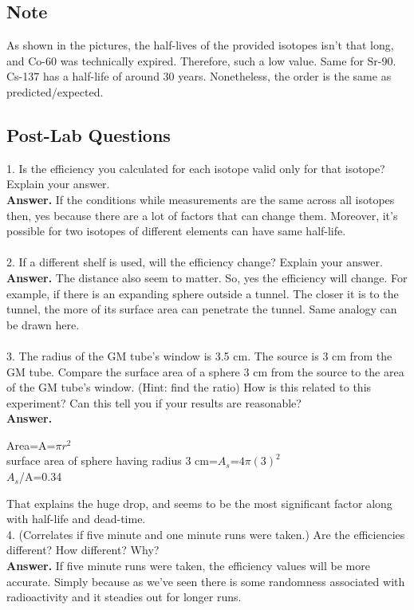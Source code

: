 \documentclass[twocolumn]{article}
\begin{document}
\subsection*{Note}
As shown in the pictures, the half-lives of the provided isotopes isn't that long, and Co-60 was technically expired. Therefore, such a low value. Same for Sr-90. Cs-137 has a half-life of around 30 years. Nonetheless, the order is the same as predicted/expected. 
\subsection*{Post-Lab Questions}

1. Is the efficiency you calculated for each isotope valid only for that isotope? Explain your answer.\\
\textbf{Answer.} If the conditions while measurements are the same across all isotopes then, yes because there are a lot of factors that can change them. Moreover, it's possible for two isotopes of different elements can have same half-life. \\
\\
2. If a different shelf is used, will the efficiency change? Explain your answer.\\
\textbf{Answer.} The distance also seem to matter. So, yes the efficiency will change. For example, if there is an expanding sphere outside a tunnel. The closer it is to the tunnel, the more of its surface area can penetrate the tunnel. Same analogy can be drawn here. \\
\\
3. The radius of the GM tube’s window is 3.5 cm. The source is 3 cm from the
GM tube. Compare the surface area of a sphere 3 cm from the source to the area of the GM tube’s window. (Hint: find the ratio) How is this related to this experiment? Can this tell you if your results are reasonable?\\
\textbf{Answer.}
\begin{center}
Area=A=$\pi r^2$\\
surface area of sphere having radius 3 cm=$A_s$=$4\pi (3)^2$\\
$A_s$/A=0.34
\end{center}
That explains the huge drop, and seems to be the most significant factor along with half-life and dead-time.
\\

4. (Correlates if five minute and one minute runs were taken.) Are the efficiencies different? How different? Why?\\
\textbf{Answer.} If five minute runs were taken, the efficiency values will be more accurate. Simply because as we've seen there is some randomness associated with radioactivity and it steadies out for longer runs.\\
$$$$
\end{document}
